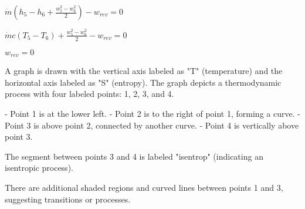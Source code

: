 \( \dot{m} (h_5 - h_6 + \frac{w_5^2 - w_6^2}{2}) - w_{rev} = 0 \)  

\( \dot{m} c (T_5 - T_6) + \frac{w_5^2 - w_6^2}{2} - w_{rev} = 0 \)  

\( w_{rev} = 0 \)

A graph is drawn with the vertical axis labeled as "T" (temperature) and the horizontal axis labeled as "S" (entropy). The graph depicts a thermodynamic process with four labeled points: 1, 2, 3, and 4.  

- Point 1 is at the lower left.  
- Point 2 is to the right of point 1, forming a curve.  
- Point 3 is above point 2, connected by another curve.  
- Point 4 is vertically above point 3.  

The segment between points 3 and 4 is labeled "isentrop" (indicating an isentropic process).  

There are additional shaded regions and curved lines between points 1 and 3, suggesting transitions or processes.